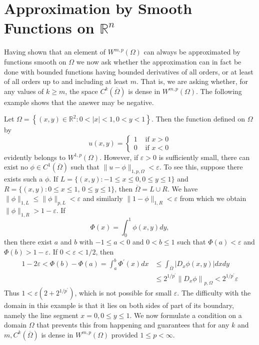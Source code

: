 \section{Approximation by Smooth Functions on $\mathbb{R}^n$}


\begin{para}
  Having shown that an element of $W^{m,p}(\Omega)$ can always be approximated by functions 
  smooth on $\Omega$ we now ask whether the approximation can in fact be done with bounded 
  functions having bounded derivatives of all orders, or at least of all orders up to and 
  including at least $m$. That is, we are asking whether, for any values of $k \geq m$, the space 
  $C^k(\overline{\Omega})$ is dense in $W^{m,p}(\Omega)$. The following example shows that the answer 
  may be negative.
\end{para}


\begin{example}
  Let $\Omega=\left\{(x, y) \in \mathbb{R}^2: 0<|x|<1,0<y<1\right\}$. Then the function defined on $\Omega$ by
  \[
  u(x, y)= \begin{cases}1 & \text { if } x>0 \\ 0 & \text { if } x<0\end{cases}
  \]
  evidently belongs to $W^{1, p}(\Omega)$. However, if $\varepsilon>0$ is sufficiently small, 
  there can exist no $\phi \in C^1(\overline{\Omega})$ such that
  $\|u-\phi\|_{1, p, \Omega}<\varepsilon$. To see this, suppose there exists such a $\phi$.
  If $L=\{(x, y):-1 \leq x \leq 0,0 \leq y \leq 1\}$ and $R=\{(x, y): 0 \leq x \leq 1$, $0 \leq y \leq 1\}$, then $\overline{\Omega}=L \cup R$.
  We have $\|\phi\|_{1, L} \leq\|\phi\|_{p, L}<\varepsilon$ and
  similarly $\|1-\phi\|_{1, R}<\varepsilon$ from which we obtain $\|\phi\|_{1, R}>1-\varepsilon$. 
  If
  \[
  \Phi(x)=\int_0^1 \phi(x, y) d y,
  \]
  then there exist $a$ and $b$ with $-1 \leq a<0$ and $0<b \leq 1$ such
  that $\Phi(a)<\varepsilon$ and $\Phi(b)>1-\varepsilon$. If $0<\varepsilon<1 / 2$, then
  \[
  \begin{aligned}
  1-2 \varepsilon<\Phi(b)-\Phi(a)=\int_a^b \Phi^{\prime}(x) d x & \leq \int_{\overline{\Omega}}\left|D_x \phi(x, y)\right| d x d y \\
  & \leq 2^{1 / p^{\prime}}\left\|D_x \phi\right\|_{p, \Omega}<2^{1 / p^{\prime}} \varepsilon
  \end{aligned}
  \]
  Thus $1<\varepsilon\left(2+2^{1 / p^{\prime}}\right)$, which is not possible for small $\varepsilon$.
  The difficulty with the domain in this example is that it lies on both sides of part of its 
  boundary, namely the line segment $x=0,0 \leq y \leq 1$. We now formulate a condition on a 
  domain $\Omega$ that prevents this from happening and guarantees that for any $k$
  and $m, C^k(\overline{\Omega})$ is dense in $W^{m,p}(\Omega)$ provided $1 \leq p<\infty$.
\end{example}


